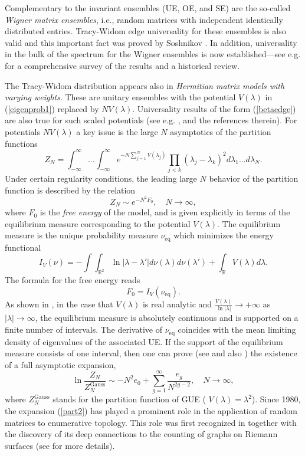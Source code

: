 \documentclass[11pt,letterpaper,reqno]{amsart}
\theoremstyle{definition}
\theoremstyle{remark}
\numberwithin{equation}{section}
\begin{document}
Complementary to the invariant ensembles (UE, OE, and SE)  are the so-called  {\it Wigner matrix ensembles}, i.e.,
random matrices with independent identically distributed entries. Tracy-Widom edge universality for these
ensembles is also valid and this important fact  was proved by Soshnikov \cite{Sos}.
In addition, universality in the bulk of the spectrum  for the Wigner ensembles
is now established---see e.g. \cite{Erd} for a comprehensive survey of the results and a historical review.

The Tracy-Widom distribution appears also in  {\it Hermitian matrix models with varying weights}.
These are   unitary ensembles  with  the potential $V(\lambda)$
in (\ref{eigenprob1}) replaced by $NV(\lambda)$. Universality results of the
form (\ref{betaedge}) are also true for such scaled potentials
(see e.g. \cite{DKMVZ1}, \cite{deift2} and the references therein).
For potentials $NV(\lambda)$ a key issue  is
the large $N$ asymptotics of the partition functions
\begin{equation}\label{part0}
Z_N = \int_{-\infty}^{\infty}...\int_{-\infty}^{\infty}e^{-N\sum_{j=1}^{N}V(\lambda_j)}
\prod_{j<k}(\lambda_j - \lambda_k)^{2}d\lambda_1...d\lambda_N.
\end{equation}
Under certain regularity conditions, the leading large $N$  behavior of
the partition function is described by the relation \cite{Joh}
\begin{equation}\label{part1}
Z_N \sim e^{-N^2F_0},\quad N \to \infty,
\end{equation}
where $F_0$ is the {\it free energy} of the model, and  is
given explicitly in terms of the
equilibrium measure corresponding to the potential $V(\lambda)$.
The equilibrium measure is the unique probability measure $\nu_{\textrm{eq}}$
which minimizes the energy functional
$$
I_{V}(\nu) = -\int\int_{\mathbb{R}^2}\ln|\lambda-\lambda'|d\nu(\lambda)d\nu(\lambda')
+ \int_{\mathbb{R}}V(\lambda)d\lambda.
$$
The formula for the free energy reads
$$
F_0 = I_{V}(\nu_{\textrm{eq}}).
$$
As shown in \cite{DKM}, in the case that $V(\lambda)$ is real analytic and
$\frac{V(\lambda)}{\ln |\lambda|} \to + \infty$ as  $|\lambda| \to \infty$,
 the equilibrium measure is absolutely continuous and is supported on a finite
number of intervals.  The derivative of $\nu_{\textrm{eq}}$   coincides with  the mean limiting density of
eigenvalues of the associated UE. If the support of the equilibrium measure consists
of one interval, then one can prove (see  \cite{EM} and also \cite{BI}) the existence
of a full asymptotic expansion,
\begin{equation}\label{part2}
\ln \frac{Z_{N}}{Z_{N}^{\textrm{Gauss}}} \sim -N^2e_0 + \sum_{g=1}^{\infty}\frac{e_{g}}{N^{2g-2}}, \quad N \to \infty,
\end{equation}
where $Z_{N}^{\textrm{Gauss}}$ stands for the partition function of  GUE
( $V(\lambda) = \lambda^2$). Since 1980, the
expansion (\ref{part2}) has played  a  prominent role in the application
of random matrices to enumerative topology. This role was first recognized
in \cite{BIZ}  together with the discovery of its deep connections to the counting
of graphs on  Riemann surfaces  (see \cite{EM} for more details).
\end{document}
